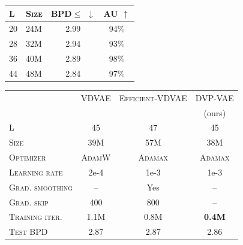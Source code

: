 \begin{table}[t]
\begin{minipage}[t]{.3\linewidth}
    \centering
        \label{tab:increase_num_layers}
    \begin{tabular}{ll|cc}
        \toprule
         \textsc{L} & \textsc{Size} & \textsc{BPD}$\leq$ $\downarrow$ & \textsc{AU} $\uparrow$\\
        \midrule
        20 & 24M & 2.99 & 94\%\\
        28 & 32M & 2.94 & 93\% \\
        36 & 40M & 2.89 & 98\%\\
        44 & 48M & 2.84 & 97\%\\
        \bottomrule
    \end{tabular}
    \vskip -25pt   
\end{minipage}\hfill
\begin{minipage}[t]{.67\linewidth}
    \centering
    \vskip -5pt   
    \label{tab:ablation_stability}
    \small{
    \begin{tabular}{l|ccc}
        \toprule
         & \small{\textsc{VDVAE}} & \small{\textsc{Efficient-VDVAE}} &\small{\textsc{DVP-VAE}} \\
         & \footnotesize{\citep{Child2020-ze}} & \footnotesize{\citep{hazami2022efficientvdvae}}&\footnotesize{(ours)}\\
        \midrule
        \textsc{L} & 45 & 47 & 45 \\
        \textsc{Size} & 39M & 57M & 38M \\
        \textsc{Optimizer} & \textsc{AdamW} & \textsc{Adamax} & \textsc{Adamax}\\
        \textsc{Learning rate} & 2e-4 & 1e-3 & 1e-3\\
        \textsc{Grad. smoothing} & -- & Yes & --\\
        \textsc{Grad. skip} & 400 & 800 & --\\
        \textsc{Training iter.} & 1.1M & 0.8M &\textbf{0.4M} \\
        \midrule
        \textsc{Test BPD} & 2.87 & 2.87 &2.86 \\
        \bottomrule
    \end{tabular}
    }
    \vskip -30pt   
\end{minipage}
\end{table}


